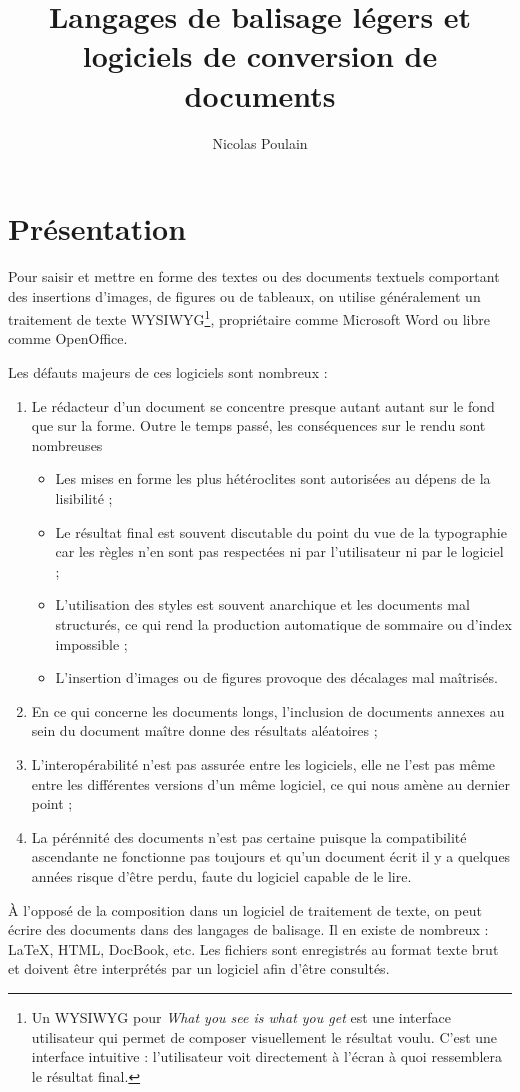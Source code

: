 \documentclass[]{article}
\title{Langages de balisage légers et logiciels de conversion de documents}
\author{Nicolas Poulain}
\begin{document}
\maketitle

\tableofcontents

\section{Présentation}

Pour saisir et mettre en forme des textes ou des documents textuels
comportant des insertions d'images, de figures ou de tableaux, on
utilise généralement un traitement de texte WYSIWYG\footnote{Un WYSIWYG
  pour \emph{What you see is what you get} est une interface utilisateur
  qui permet de composer visuellement le résultat voulu. C'est une
  interface intuitive : l'utilisateur voit directement à l'écran à quoi
  ressemblera le résultat final.}, propriétaire comme Microsoft Word ou
libre comme OpenOffice.

Les défauts majeurs de ces logiciels sont nombreux :

\begin{enumerate}[1.]
\item
  Le rédacteur d'un document se concentre presque autant autant sur le
  fond que sur la forme. Outre le temps passé, les conséquences sur le
  rendu sont nombreuses
  \begin{itemize}
  \item
    Les mises en forme les plus hétéroclites sont autorisées au dépens
    de la lisibilité ;
  \item
    Le résultat final est souvent discutable du point du vue de la
    typographie car les règles n'en sont pas respectées ni par
    l'utilisateur ni par le logiciel ;
  \item
    L'utilisation des styles est souvent anarchique et les documents mal
    structurés, ce qui rend la production automatique de sommaire ou
    d'index impossible ;
  \item
    L'insertion d'images ou de figures provoque des décalages mal
    maîtrisés.
  \end{itemize}
\item
  En ce qui concerne les documents longs, l'inclusion de documents
  annexes au sein du document maître donne des résultats aléatoires ;
\item
  L'interopérabilité n'est pas assurée entre les logiciels, elle ne
  l'est pas même entre les différentes versions d'un même logiciel, ce
  qui nous amène au dernier point ;
\item
  La pérénnité des documents n'est pas certaine puisque la compatibilité
  ascendante ne fonctionne pas toujours et qu'un document écrit il y a
  quelques années risque d'être perdu, faute du logiciel capable de le
  lire.
\end{enumerate}
À l'opposé de la composition dans un logiciel de traitement de texte, on
peut écrire des documents dans des langages de balisage. Il en existe de
nombreux : LaTeX, HTML, DocBook, etc. Les fichiers sont enregistrés au
format texte brut et doivent être interprétés par un logiciel afin
d'être consultés.
\end{document}
